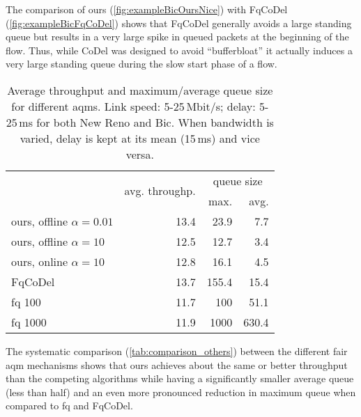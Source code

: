 \documentclass[conference]{IEEEtran}
\begin{document}
The comparison of \gls{ours} (\autoref{fig:exampleBicOursNice}) with FqCoDel (\autoref{fig:exampleBicFqCoDel}) shows that FqCoDel generally avoids a large standing queue but results in a very large spike in queued packets at the beginning of the flow. Thus, while CoDel was designed to avoid ``bufferbloat'' it actually induces a very large standing queue during the slow start phase of a flow. 

\begin{table}
\caption{Average throughput and maximum/average queue size for different \glspl{aqm}. Link speed: 5-25\,Mbit/s; delay: 5-25\,ms for both New Reno and Bic. When bandwidth is varied, delay is kept at its mean (15\,ms) and vice versa.} \label{tab:comparison_others}
\centering
\begin{tabular}{l r r r} \toprule
& \multirow{2}{*}{avg. throughp.} & \multicolumn{2}{c}{queue size} \\
& & max. & avg. \\ \midrule
\gls{ours}, offline $\alpha=0.01$ & 13.4 & 23.9 & 7.7\\
\gls{ours}, offline $\alpha=10$ & 12.5 & 12.7 & 3.4\\
\gls{ours}, online $\alpha=10$ & 12.8 & 16.1 & 4.5\\
FqCoDel	& 13.7 & 155.4 & 15.4\\
fq 100	& 11.7 & 100 & 51.1\\
fq 1000	& 11.9 & 1000 & 630.4 \\
\bottomrule
\end{tabular}
\end{table}

The systematic comparison (\autoref{tab:comparison_others}) between the different fair \gls{aqm} mechanisms shows that \gls{ours} achieves about the same or better throughput than the competing algorithms while having a significantly smaller average queue (less than half) and an even more pronounced reduction in maximum queue when compared to fq and FqCoDel.  
\end{document}
